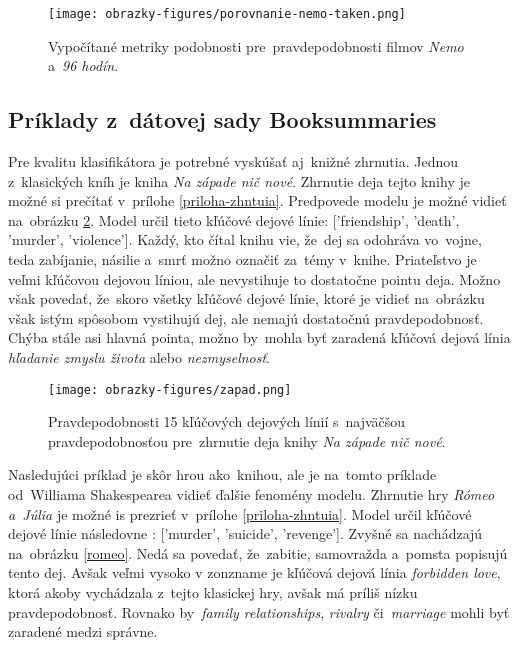 \begin{figure}[ht!]
	\centering
	\texttt{[image: obrazky-figures/porovnanie-nemo-taken.png]}
	\caption{Vypočítané metriky podobnosti pre~pravdepodobnosti filmov \textit{Nemo} a~\textit{96 hodín}.}
	\label{porovnanie-nemo-taken}
\end{figure}

\pagebreak
\subsection*{Príklady z~dátovej sady Booksummaries}

Pre kvalitu klasifikátora je potrebné vyskúšať aj~knižné zhrnutia. Jednou z~klasických kníh je kniha \textit{Na západe nič nové}. Zhrnutie deja tejto knihy je možné si prečítať v~prílohe \ref{priloha-zhntuia}. Predpovede modelu je možné vidieť na~obrázku \ref{zapad}. Model určil tieto kľúčové dejové línie: ['friendship', 'death', 'murder', 'violence']. Každý, kto čítal knihu vie, že~dej sa odohráva vo~vojne, teda zabíjanie, násilie a~smrť možno označiť za~témy v~knihe. Priateľstvo je veľmi kľúčovou dejovou líniou, ale nevystihuje to dostatočne pointu deja. Možno však povedať, že~skoro všetky kľúčové dejové línie, ktoré je vidieť na~obrázku však istým spôsobom vystihujú dej, ale nemajú dostatočnú pravdepodobnosť. Chýba stále asi hlavná pointa, možno by~mohla byť zaradená kľúčová dejová línia \textit{hľadanie zmyslu života} alebo \textit{nezmyselnosť}. 

\begin{figure}[ht!]
	\centering
	\texttt{[image: obrazky-figures/zapad.png]}
	\caption{Pravdepodobnosti 15 kľúčových dejových línií s~najväčšou pravdepodobnosťou pre~zhrnutie deja knihy \textit{Na západe nič nové}.}
	\label{zapad}
\end{figure}

\pagebreak
Nasledujúci príklad je skôr hrou ako~knihou, ale je na~tomto príklade od~Williama Shakespearea vidieť ďalšie fenomény modelu. Zhrnutie hry \textit{Rómeo a~Júlia} je možné is prezrieť v~prílohe \ref{priloha-zhntuia}. Model určil kľúčové dejové línie následovne : ['murder', 'suicide', 'revenge']. Zvyšné sa nachádzajú na~obrázku \ref{romeo}. Nedá sa povedať, že~zabitie, samovražda a~pomsta popisujú tento dej. Avšak veľmi vysoko v zonzname je kľúčová dejová línia \textit{forbidden love}, ktorá akoby vychádzala z~tejto klasickej hry, avšak má príliš nízku pravdepodobnosť. Rovnako by~\textit{family relationships}, \textit{rivalry} či~\textit{marriage} mohli byť zaradené medzi správne.

